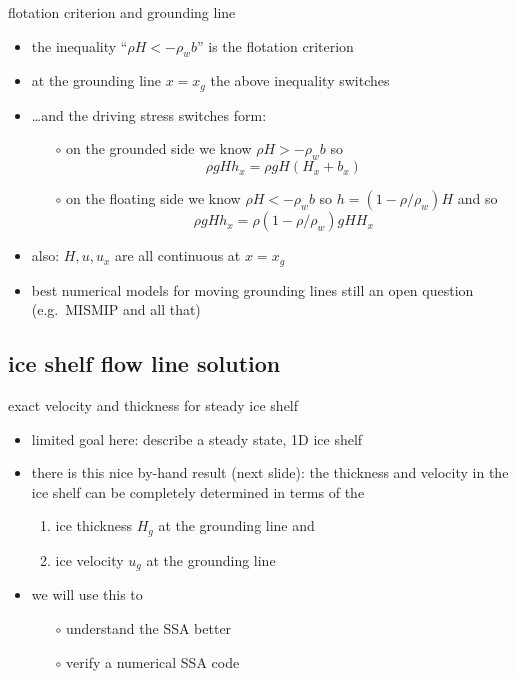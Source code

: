 \begin{frame}{flotation criterion and grounding line}

\begin{itemize}
\item the inequality ``$\rho H < - \rho_w b$'' is the \alert{flotation criterion}
\item at the grounding line $x=x_g$ the above inequality switches
\item \dots and the driving stress switches form:
  \begin{itemize}
  \item[$\circ$] on the grounded side we know $\rho H > - \rho_w b$ so
  	$$\rho g H h_x = \rho g H (H_x + b_x)$$
  \item[$\circ$] on the floating side we know $\rho H < - \rho_w b$ so $h = (1-\rho/\rho_w) H$ and so
  	$$\rho g H h_x = \rho(1-\rho/\rho_w) g H H_x$$
  \end{itemize}
\item also: $H,u,u_x$ are all continuous at $x=x_g$
\item best numerical models for moving grounding lines still an open question (e.g.~MISMIP and all that)
\end{itemize}
\end{frame}



\subsection{ice shelf flow line solution}


\begin{frame}{exact velocity and thickness for steady ice shelf}

\begin{itemize}
\item limited goal here: describe a steady state, 1D ice shelf
\item there is this nice \alert{by-hand} result (next slide): the thickness and velocity in the ice shelf can be completely determined \nocite{MacAyealBarcilon,vanderVeen85} in terms of the 
  \begin{enumerate}
  \item ice thickness $H_g$ at the grounding line and
  \item ice velocity $u_g$ at the grounding line
  \end{enumerate}
\item we will use this to
  \begin{itemize}
  \item[$\circ$] understand the SSA better
  \item[$\circ$] verify a numerical SSA code
  \end{itemize}
\end{itemize}
\end{frame}


